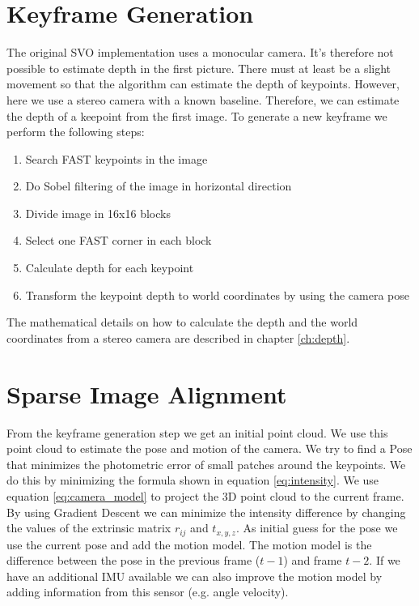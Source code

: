 \documentclass[11pt,a4paper,titlepage,oneside]{report}
\begin{document}
\section{Keyframe Generation}\label{sec:initialization}
The original SVO implementation uses a monocular camera. It's therefore not possible to estimate depth in the first picture. There must at least be a slight movement so that the algorithm can estimate the depth of keypoints. However, here we use a stereo camera with a known baseline. Therefore, we can estimate the depth of a keepoint from the first image. To generate a new keyframe we perform the following steps:
\begin{enumerate}
  \item{Search FAST keypoints in the image \cite{fast}}
  \item{Do Sobel filtering of the image in horizontal direction}
  \item{Divide image in 16x16 blocks}
  \item{Select one FAST corner in each block}
  \item{Calculate depth for each keypoint}
  \item{Transform the keypoint depth to world coordinates by using the camera pose}
\end{enumerate}

The mathematical details on how to calculate the depth and the world coordinates from a stereo camera are described in chapter \ref{ch:depth}.

\section{Sparse Image Alignment}\label{sec:sia}

From the keyframe generation step we get an initial point cloud. We use this point cloud to estimate the pose and motion of the camera. We try to find a Pose that minimizes the photometric error of small patches around the keypoints. We do this by minimizing the formula shown in equation \ref{eq:intensity}. We use equation \ref{eq:camera_model} to project the 3D point cloud to the current frame. By using Gradient Descent we can minimize the intensity difference by changing the values of the extrinsic matrix $r_{ij}$ and $t_{x,y,z}$. As initial guess for the pose we use the current pose and add the motion model. The motion model is the difference between the pose in the previous frame ($t-1$) and frame $t-2$. If we have an additional IMU available we can also improve the motion model by adding information from this sensor (e.g. angle velocity).
\end{document}
